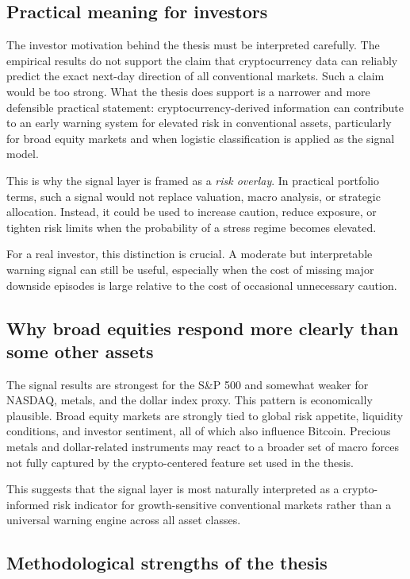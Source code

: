 \subsection{Practical meaning for investors}

The investor motivation behind the thesis must be interpreted carefully. The empirical results do not support the claim that cryptocurrency data can reliably predict the exact next-day direction of all conventional markets. Such a claim would be too strong. What the thesis does support is a narrower and more defensible practical statement: cryptocurrency-derived information can contribute to an early warning system for elevated risk in conventional assets, particularly for broad equity markets and when logistic classification is applied as the signal model.

This is why the signal layer is framed as a \emph{risk overlay}. In practical portfolio terms, such a signal would not replace valuation, macro analysis, or strategic allocation. Instead, it could be used to increase caution, reduce exposure, or tighten risk limits when the probability of a stress regime becomes elevated.

For a real investor, this distinction is crucial. A moderate but interpretable warning signal can still be useful, especially when the cost of missing major downside episodes is large relative to the cost of occasional unnecessary caution.

\subsection{Why broad equities respond more clearly than some other assets}

The signal results are strongest for the S\&P 500 and somewhat weaker for NASDAQ, metals, and the dollar index proxy. This pattern is economically plausible. Broad equity markets are strongly tied to global risk appetite, liquidity conditions, and investor sentiment, all of which also influence Bitcoin. Precious metals and dollar-related instruments may react to a broader set of macro forces not fully captured by the crypto-centered feature set used in the thesis.

This suggests that the signal layer is most naturally interpreted as a crypto-informed risk indicator for growth-sensitive conventional markets rather than a universal warning engine across all asset classes.

\subsection{Methodological strengths of the thesis}

